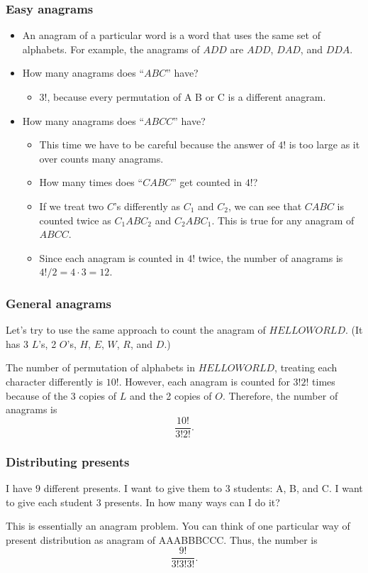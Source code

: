\begin{frame}\frametitle{Easy anagrams}
  \begin{itemize}
  \item An anagram of a particular word is a word that uses the same
    set of alphabets.  For example, the anagrams of $ADD$ are $ADD$,
    $DAD$, and $DDA$. \pause
  \item How many anagrams does ``$ABC$'' have? \pause
    \begin{itemize}
    \item $3!$, because every permutation of A B or C is a different
      anagram. \pause
    \end{itemize}
  \item How many anagrams does ``$ABCC$'' have? \pause
    \begin{itemize}
    \item This time we have to be careful because the answer of $4!$
      is too large as it over counts many anagrams. \pause
    \item How many times does ``$CABC$'' get counted in $4!$? \pause
    \item If we treat two $C$'s differently as $C_1$ and $C_2$, we can
      see that $CABC$ is counted twice as $C_1ABC_2$ and $C_2ABC_1$.
      This is true for any anagram of $ABCC$.  \pause
    \item Since each anagram is counted in $4!$ twice, the number of
      anagrams is $4!/2 = 4\cdot 3 = 12$.
    \end{itemize}
  \end{itemize}
\end{frame}

\begin{frame}\frametitle{General anagrams}
  \begin{tcolorbox}
    Let's try to use the same approach to count the anagram of
    $HELLOWORLD$. (It has 3 $L$'s, 2 $O$'s, $H$, $E$, $W$, $R$, and
    $D$.)
  \end{tcolorbox}

  \pause
  \vspace{0.2in}
  
  The number of permutation of alphabets in $HELLOWORLD$, treating
  each character differently is $10!$.  However, each anagram is
  counted for $3!2!$ times because of the 3 copies of $L$ and the 2
  copies of $O$.  Therefore, the number of anagrams is
  \[
  \frac{10!}{3!2!}.
  \]
\end{frame}

\begin{frame}\frametitle{Distributing presents}
  \begin{tcolorbox}
    I have $9$ different presents.  I want to give them to $3$
    students: A, B, and C.  I want to give each student $3$ presents.
    In how many ways can I do it?
  \end{tcolorbox}

  \pause
  \vspace{0.2in} This is essentially an anagram problem.  You can
  think of one particular way of present distribution as anagram of
  AAABBBCCC.  Thus, the number is
  \[\frac{9!}{3!3!3!}.\]
\end{frame}
